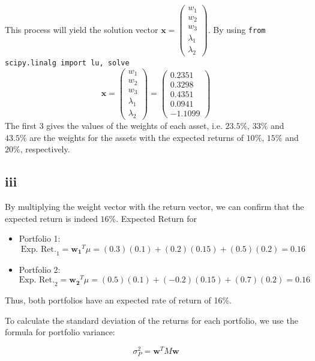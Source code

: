 \documentclass{article}
\begin{document}
This process will yield the solution vector \( \mathbf{x} = \begin{pmatrix} w_1 \\ w_2 \\ w_3 \\ \lambda_1 \\ \lambda_2 \end{pmatrix} \).
By using \texttt{from scipy.linalg import lu, solve}
\[
    \mathbf{x} =
    \begin{pmatrix}
        w_1       \\
        w_2       \\
        w_3       \\
        \lambda_1 \\
        \lambda_2
    \end{pmatrix}
    =
    \begin{pmatrix}
        0.2351 \\
        0.3298 \\
        0.4351 \\
        0.0941 \\
        -1.1099
    \end{pmatrix}
\]
The first 3 gives the values of the weights of each asset, i.e.
$23.5\%$, $33\%$ and $43.5\%$ are the weights for the assets with the expected returns of $10\%$, $15\%$ and $20\%$, respectively.
\subsection*{iii}
By multiplying the weight vector with the return vector, we can confirm that the expected return is indeed $16\%$.
Expected Return for
\begin{itemize}
    \item Portfolio 1:
          \[
              \text{Exp. Ret.}_1 = \mathbf{w_1}^T \mu = (0.3)(0.1) + (0.2)(0.15) + (0.5)(0.2) = 0.16
          \]

    \item Portfolio 2:
          \[
              \text{Exp. Ret.}_2 = \mathbf{w_2}^T \mu = (0.5)(0.1) + (-0.2)(0.15) + (0.7)(0.2) = 0.16
          \]
\end{itemize}

Thus, both portfolios have an expected rate of return of 16\%.

To calculate the standard deviation of the returns for each portfolio, we use the formula for portfolio variance:

\[
    \sigma_P^2 = \mathbf{w}^T M \mathbf{w}
\]
\end{document}
